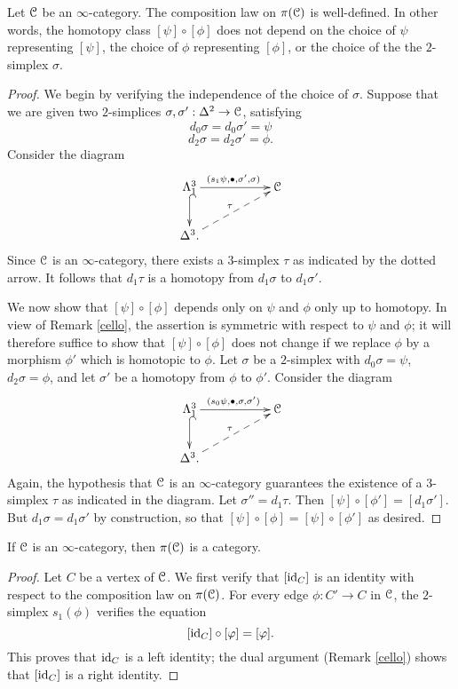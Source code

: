 \begin{1.2.3 The homotopy category}
\begin{proposition}\label{trug}
Let $\operatorname{\mathcal{C}}$ be an $\infty$-category.
The composition law on $\pi(\operatorname{\mathcal{C}})$ is well-defined. In other words, the homotopy class $[\psi] \circ [\phi]$ does not depend on the choice of $\psi$ representing $[\psi]$, the choice of $\phi$ representing $[ \phi]$, or the choice of the the $2$-simplex $\sigma$.
\end{proposition}

\begin{proof}
We begin by verifying the independence of the choice of $\sigma$. Suppose that we are given two $2$-simplices $\sigma, \sigma': \Delta^2 \rightarrow \operatorname{\mathcal{C}}$, satisfying
$$ d_0 \sigma = d_0 \sigma' = \psi $$
$$ d_2 \sigma = d_2 \sigma' = \phi.$$
Consider the diagram
$$ \xymatrix{ \Lambda^3_1 \ar@{^{(}->}[d] \ar[rr]^{( s_1 \psi, \bigdot, \sigma', \sigma)} & & \calC \\
\Delta^3 \ar@{-->}[urr]^{\tau}. & & }$$
Since $\operatorname{\mathcal{C}}$ is an $\infty$-category, there exists a $3$-simplex $\tau$ as indicated by the dotted arrow. It follows that $d_1 \tau$ is a homotopy from $d_1 \sigma$ to $d_1 \sigma'$.

We now show that $[\psi ] \circ [\phi]$ depends only on $\psi$ and $\phi$ only up to homotopy.
In view of Remark \ref{cello}, the assertion is symmetric with respect to $\psi$ and $\phi$; it will therefore suffice to show that $[ \psi ] \circ [ \phi ]$ does not change if we replace $\phi$ by a morphism $\phi'$ which is homotopic to $\phi$. Let $\sigma$ be a $2$-simplex with
$d_0 \sigma = \psi$, $d_2 \sigma = \phi$, and let $\sigma'$ be a homotopy from $\phi$ to $\phi'$.
Consider the diagram
$$ \xymatrix{ \Lambda^3_1 \ar@{^{(}->}[d] \ar[rr]^{ (s_0 \psi, \bigdot, \sigma, \sigma') } & & \calC \\
\Delta^3. \ar@{-->}[urr]^{\tau} & & }$$
Again, the hypothesis that $\operatorname{\mathcal{C}}$ is an $\infty$-category guarantees the existence of a $3$-simplex $\tau$ as indicated in the diagram. Let $\sigma'' = d_1 \tau$. Then 
$[ \psi ] \circ [ \phi' ] = [ d_1 \sigma' ]$. But $d_1 \sigma = d_1 \sigma'$ by construction, so that
$[ \psi ] \circ [ \phi ] = [ \psi ] \circ [ \phi' ]$ as desired.
\end{proof}

\begin{proposition}
If $\operatorname{\mathcal{C}}$ is an $\infty$-category, then $\pi(\operatorname{\mathcal{C}})$ is a category.
\end{proposition}

\begin{proof}
Let $C$ be a vertex of $\operatorname{\mathcal{C}}$. We first verify that $[\operatorname{id}_{C}]$ is an identity with respect to the composition law on $\pi(\operatorname{\mathcal{C}})$. For every edge $\phi: C' \rightarrow C$ in $\operatorname{\mathcal{C}}$, the
$2$-simplex $s_1(\phi)$ verifies the equation
$$ [ \operatorname{id}_{C} ] \circ [\varphi] = [\varphi].$$
This proves that $\operatorname{id}_{C}$ is a left
identity; the dual argument (Remark \ref{cello}) shows that $[\operatorname{id}_{C}]$ is a right
identity.


\end{proof}
\end{1.2.3 The homotopy category}
